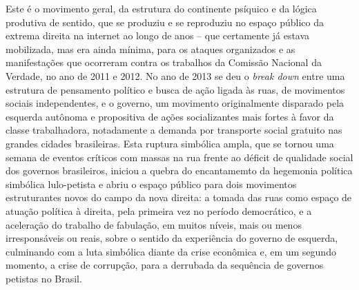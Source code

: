 Este é o movimento geral, da estrutura do continente psíquico e da
lógica produtiva de sentido, que se produziu e se reproduziu no espaço
público da extrema direita na internet ao longo de anos -- que
certamente já estava mobilizada, mas era ainda mínima, para os ataques
organizados e as manifestações que ocorreram contra os trabalhos da
Comissão Nacional da Verdade, no ano de 2011 e 2012. No ano de 2013 se
deu o \emph{break down} entre uma estrutura de pensamento político e
busca de ação ligada às ruas, de movimentos sociais independentes, e o
governo, um movimento originalmente disparado pela esquerda autônoma e
propositiva de ações socializantes mais fortes à favor da classe
trabalhadora, notadamente a demanda por transporte social gratuito nas
grandes cidades brasileiras. Esta ruptura simbólica ampla, que se tornou
uma semana de eventos críticos com massas na rua frente ao déficit de
qualidade social dos governos brasileiros, iniciou a quebra do
encantamemto da hegemonia política simbólica lulo-petista e abriu o
espaço público para dois movimentos estruturantes novos do campo da nova
direita: a tomada das ruas como espaço de atuação política à direita,
pela primeira vez no período democrático, e a aceleração do trabalho de
fabulação, em muitos níveis, mais ou menos irresponsáveis ou reais,
sobre o sentido da experiência do governo de esquerda, culminando com a
luta simbólica diante da crise econômica e, em um segundo momento, a
crise de corrupção, para a derrubada da sequência de governos petistas
no Brasil.

